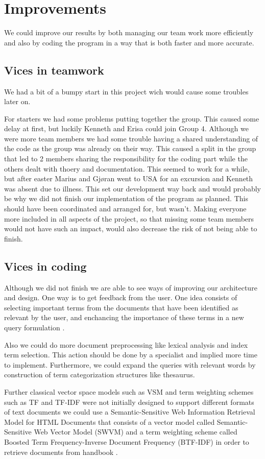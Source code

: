 \chapter{Improvements}
We could improve our results by both managing our team work more efficiently and also by coding the program in a way that is both faster and more accurate.
\section{Vices in teamwork}
We had a bit of a bumpy start in this project wich would cause some troubles later on.

For starters we had some problems putting together the group. This caused some delay at first, but luckily Kenneth and Erisa could join Group 4. Although we were more team members we had some trouble having a shared understanding of the code as the group was already on their way. This caused  a split in the group that led to 2 members sharing the responsibility for the coding part while the others dealt with thoery and documentation. This seemed to work for a while, but after easter Marius and Gjøran went to USA for an excursion and Kenneth was absent due to illness. This set our development way back and would probably be why we did not finish our implementation of the program as planned. This should have been coordinated and arranged for, but wasn't. Making everyone more included in all aspects of the project, so that missing some team members would not have such an impact, would also decrease the risk of not being able to finish.

\section{Vices in coding}
Although we did not finish we are able to see ways of improving our architecture and design. One way is to get feedback from the user. One idea consists of selecting important terms from the documents that have been identified as relevant by the user, and enchancing the importance of these terms in a new query formulation \cite{MIR}.

Also we could do more document preprocessing like lexical analysis and index term selection. This action should be done by a specialist and implied more time to implement. Furthermore, we could expand the queries with relevant words by construction of term categorization structures like thesaurus.

Further classical vector space models such as VSM and term weighting schemes such as TF and TF-IDF were not initially designed to support different formats of text documents we could use a Semantic-Sensitive Web Information Retrieval Model for HTML Documents that consists of a vector model called Semantic-Sensitive Web Vector Model (SWVM) and a term weighting scheme called Boosted Term Frequency-Inverse Document Frequency (BTF-IDF) in order to retrieve documents from handbook \cite{SSWI}.

